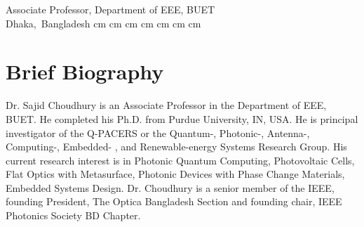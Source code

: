 \documentclass[cvauthor={Dr. Sajid Muhaimin Choudhury}]{buetcv}
\begin{document}
    \placelastupdatedtext %
    \begin{header}
        \fontsize{30 pt}{30 pt}
        \textbf{\cvauthor}

        \vspace{0.2 cm}
        \fontsize{20 pt}{20 pt}
        Associate Professor, Department of EEE, BUET \\
        \vspace{0.2 cm}        
        \normalsize
        \mbox{{\footnotesize\faMapMarker*}\hspace*{0.13cm}Dhaka, Bangladesh}%
         cm%
        \AND%
         cm%
        \mbox{}%
         cm%
        \AND%
         cm%
        \mbox{}%
         cm%
        \AND%
         cm%
        \mbox{}%
         cm%
    \end{header}

    \vspace{0.3 cm - 0.3 cm}


    \section{Brief Biography}
        \begin{onecolentry}
            Dr. Sajid Choudhury is an Associate Professor in the Department of EEE, BUET. He completed his Ph.D. from Purdue University, IN, USA. He is principal investigator of the Q-PACERS or the Quantum-, Photonic-, Antenna-, Computing-, Embedded- , and Renewable-energy Systems Research Group. His current research interest is in Photonic Quantum Computing, Photovoltaic Cells, Flat Optics with Metasurface, Photonic Devices with Phase Change Materials, Embedded Systems Design. Dr. Choudhury is a senior member of the IEEE, founding President, The Optica Bangladesh Section and founding chair, IEEE Photonics Society BD Chapter.  
        \end{onecolentry}
\end{document}
